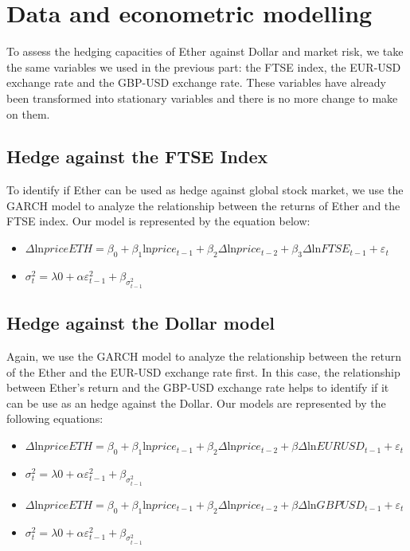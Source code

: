 \documentclass[11pt]{report}
\begin{document}
	\section{Data and econometric modelling}
	
To assess the hedging capacities of Ether against Dollar and market risk, we take the same variables we used in the previous part: the FTSE index, the EUR-USD exchange rate and the GBP-USD exchange rate. These variables have already been transformed into stationary variables and there is no more change to make on them. 

	\subsection*{Hedge against the FTSE Index}
	
To identify if Ether can be used as hedge against global stock market, we use the GARCH model to analyze the relationship between the returns of Ether and the FTSE index. Our model is represented by the equation below:
\begin{itemize}
\item $\Delta$ln$priceETH = \beta_0 + \beta_1$ln$price_{t-1} + \beta_2 \Delta$ln$price_{t-2} +  \beta_3 \Delta$ln$FTSE_{t-1} + \varepsilon_t$

\item $\sigma_t^2 = \lambda0 + \alpha \varepsilon_{t-1}^2 + \beta_{{\sigma}_{t-1}^2}$
\end{itemize}
	
	\subsection*{Hedge against the Dollar model}
	
Again, we use the GARCH model to analyze the relationship between the return of the Ether and the EUR-USD exchange rate first. In this case, the relationship between Ether’s return and the GBP-USD exchange rate helps to identify if it can be use as an hedge against the Dollar. Our models are represented by the following equations:
\begin{itemize}
\item $\Delta$ln$priceETH = \beta_0 + \beta_1$ln$price_{t-1} + \beta_2 \Delta$ln$price_{t-2} +  \beta \Delta$ln$EURUSD_{t-1} + \varepsilon_t$

\item $\sigma_t^2 = \lambda0 + \alpha \varepsilon_{t-1}^2 + \beta_{{\sigma}_{t-1}^2}$

\item $\Delta$ln$priceETH = \beta_0 + \beta_1$ln$price_{t-1} + \beta_2 \Delta$ln$price_{t-2} +  \beta \Delta$ln$GBPUSD_{t-1} + \varepsilon_t$

\item $\sigma_t^2 = \lambda0 + \alpha \varepsilon_{t-1}^2 + \beta_{{\sigma}_{t-1}^2}$
\end{itemize}
\end{document}
